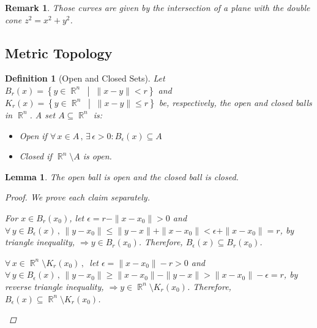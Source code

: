 \documentclass[12pt]{article}
\let\RA\Rightarrow
\let\ee\epsilon
\newcommand{\set}[2]{\left\{{#1}\;\middle|\;{#2}\right\}}
\newcommand{\Forall}[1]{\forall\,{#1}\,,\,}
\newcommand{\Exist}[1]{\exists\,{#1}:}
\DeclareMathOperator{\R}{\mathbb{R}}
\newcommand{\comp}[2][n]{\R^{#1}\setminus{#2}}
\newtheorem{definition}[theorem]{Definition}
\newtheorem{lemma}[theorem]{Lemma}
\newtheorem{remark}[theorem]{Remark}
\begin{document}
\begin{remark}
  Those curves are given by the intersection of a plane with the double cone $z^2=x^2+y^2$.
\end{remark}

\pagebreak

\subsection{Metric Topology}

\begin{definition}[Open and Closed Sets]
  \label{def_open}
  Let $B_r(x)=\set{y\in\R^n}{\|x-y\|<r}$ and $K_r(x)=\set{y\in\R^n}{\|x-y\|\leq r}$ be, respectively, the open and closed balls in $\R^n$. A set $A\subseteq \R^n$ is:
  \begin{itemize}
    \item Open if $\Forall{x\in A}\Exist{\ee>0}B_\ee(x)\subseteq A$
    \item Closed if $\comp{A}$ is open.
  \end{itemize}
\end{definition}

\begin{lemma}
  \label{open_balls}
  The open ball is open and the closed ball is closed.
  \begin{proof}
    We prove each claim separately.
    \begin{compactenum}[(i)]
      \item For $x\in B_r(x_0)$, let $\ee=r-\|x-x_0\|>0$ and $\Forall{y\in B_\ee(x)}\|y-x_0\|\leq \|y-x\|+\|x-x_0\|<\ee+\|x-x_0\|=r$, by triangle inequality, $\RA y\in B_r(x_0)$. Therefore, $B_\ee(x)\subseteq B_r(x_0)$.
      \item $\Forall{x\in \comp{K_r(x_0)}}$ let $\ee=\|x-x_0\|-r>0$ and $\Forall{y\in B_\ee(x)}\|y-x_0\|\geq \|x-x_0\|-\|y-x\|>\|x-x_0\|-\ee=r$, by reverse triangle inequality, $\RA y\in \comp{K_r(x_0)}$. Therefore, $B_\ee(x)\subseteq \comp{K_r(x_0)}$.
    \end{compactenum}
  \end{proof} 
\end{lemma}
\end{document}
